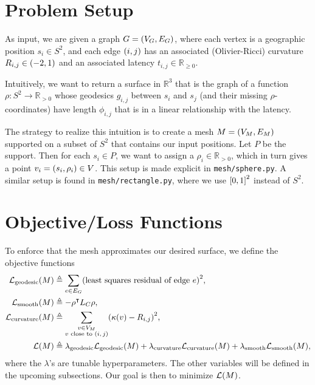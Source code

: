 \documentclass[10pt]{article}
\newcommand*\delimeter[3]{
	\ensuremath{\mathopen{}\left#2 #1\right#3\mathclose{}{\vphantom{\left#2 #1\right#3}}}
}
\newcommand*\pof[1]{\delimeter{#1}{(}{)}}
\newcommand*\ooint[1]{\delimeter{#1}{(}{)}}
\newcommand*\ccint[1]{\delimeter{#1}{[}{]}}
\begin{document}

	\section{Problem Setup}

	As input, we are given a graph \(G = \pof{V_G, E_G}\), where each vertex is a geographic position \(s_i \in S^2\), and each edge \(\pof{i, j}\) has an associated (Olivier-Ricci) curvature \(R_{i, j} \in \ooint{-2, 1}\) and an associated latency \(t_{i, j} \in \mathbb{R}_{\ge 0}\).

	Intuitively, we want to return a surface in \(\mathbb{R}^3\) that is the graph of a function \(\rho : S^2 \to \mathbb{R}_{> 0}\) whose geodesics \(g_{i, j}\) between \(s_i\) and \(s_j\) (and their missing \(\rho\)-coordinates) have length \(\phi_{i, j}\) that is in a linear relationship with the latency.

	The strategy to realize this intuition is to create a mesh \(M = \pof{V_M, E_M}\) supported on a subset of \(S^2\) that contains our input positions. Let \(P\) be the support. Then for each \(s_i \in P\), we want to assign a \(\rho_i \in \mathbb{R}_{> 0}\), which in turn gives a point \(v_i = \pof{s_i, \rho_i} \in V\). This setup is made explicit in \texttt{mesh/sphere.py}. A similar setup is found in \texttt{mesh/rectangle.py}, where we use \(\ccint{0, 1}^2\) instead of \(S^2\).

	\section{Objective/Loss Functions}

	To enforce that the mesh approximates our desired surface, we define the objective functions \begin{align*}
		\mathcal{L}_{\mathrm{geodesic}}\pof{M} &\triangleq \sum_{e \in E_G} \pof{\text{least squares residual of edge \(e\)}}^2, \\
		\mathcal{L}_{\mathrm{smooth}}\pof{M} &\triangleq -\rho^\intercal L_C\rho, \\
		\mathcal{L}_{\mathrm{curvature}}\pof{M} &\triangleq \sum_{\substack{v \in V_M \\ \text{\(v\) close to \(\pof{i, j}\)}}} \pof{\kappa\pof{v} - R_{i, j}}^2, \\
		\mathcal{L}\pof{M} &\triangleq \lambda_{\mathrm{geodesic}}\mathcal{L}_{\mathrm{geodesic}}\pof{M} + \lambda_{\mathrm{curvature}}\mathcal{L}_{\mathrm{curvature}}\pof{M} + \lambda_{\mathrm{smooth}}\mathcal{L}_{\mathrm{smooth}}\pof{M},
	\end{align*} where the \(\lambda\)'s are tunable hyperparameters. The other variables will be defined in the upcoming subsections. Our goal is then to minimize \(\mathcal{L}\pof{M}\).
\end{document}
